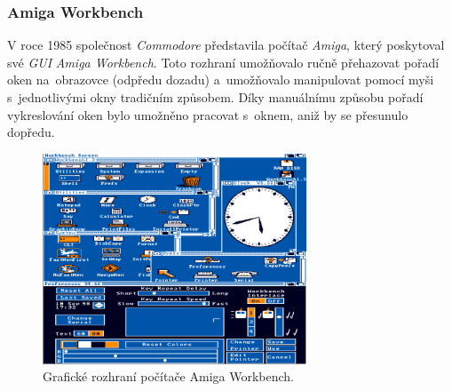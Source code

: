 \documentclass[11pt,twoside,a4paper]{book}
\begin{document}
\subsubsection{Amiga Workbench}
V roce 1985 společnost \textit{Commodore} představila počítač \textit{Amiga}, který poskytoval své \textit{GUI} \textit{Amiga Workbench}. Toto rozhraní umožňovalo ručně přehazovat pořadí oken na~obrazovce (odpředu dozadu) a~umožňovalo manipulovat pomocí myši s~jednotlivými okny tradičním způsobem. Díky manuálnímu způsobu pořadí vykreslování oken bylo umožněno pracovat s~oknem, aniž by se přesunulo dopředu.
\begin{figure}[!ht]
\begin{center}
  \includegraphics[width=0.7\textwidth]{amiga}
\caption{{\label{fig:amigaGUI}}Grafické rozhraní počítače Amiga Workbench.\cite{bib:amigaImage}}
\end{center}
\end{figure}
\end{document}
